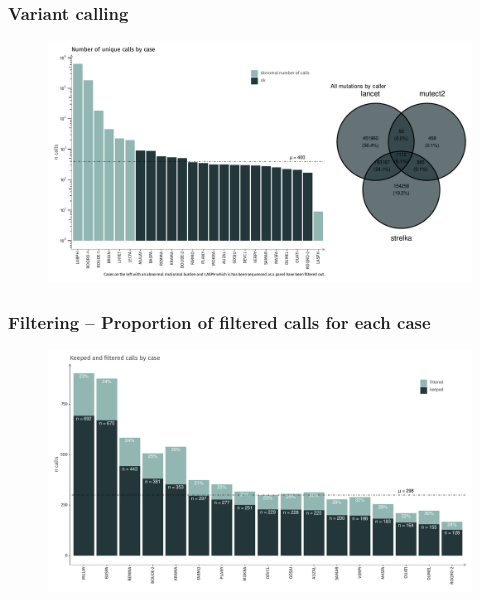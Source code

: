 \documentclass[aspectratio=169, 9pt]{beamer}
\begin{document}
\begin{frame}
    \frametitle{ Variant calling}
    \begin{figure}
        \includegraphics[height=.95\textheight]{Images/calls.pdf}
    \end{figure}
\end{frame}

\begin{frame} 
    \frametitle{ Filtering -- Proportion of filtered calls for each case}
    \begin{figure}
        \includegraphics[height=.95\textheight]{Images/filter.pdf}
    \end{figure}
\end{frame}
\end{document}
